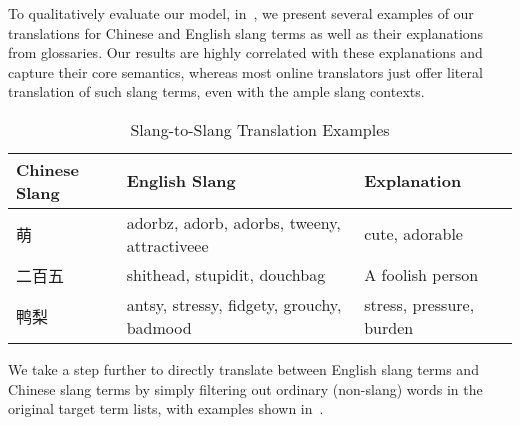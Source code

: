 To qualitatively evaluate our model, in~, 
we present several examples of our translations for Chinese and English slang 
terms as well as their explanations from glossaries.
Our results are highly correlated with these explanations and 
capture their core semantics, whereas most online translators just offer 
literal translation of such slang terms, even with the ample
slang contexts.
\begin{wraptable}{R}{0.5\textwidth} 
	\scriptsize
	\centering
	\caption{{Slang-to-Slang Translation Examples}\vspace{-5pt}}
	\begin{tabular}{C{1.92cm} C{2.5cm} C{2.0cm}}
		\textbf{Chinese Slang} & \textbf{English Slang} & \textbf{Explanation} \\ \hline
		萌 & adorbz, adorb, adorbs, tweeny, attractiveee & cute, adorable \\ \hline
		二百五 & shithead, stupidit, douchbag & A foolish person\\ \hline
		鸭梨 & antsy, stressy, fidgety, grouchy, badmood & stress, pressure, burden \\ \hline
	\end{tabular}
	\label{tab:bleis_4} 
\end{wraptable}

We take a step further to directly translate between 
English slang terms and Chinese slang terms by simply filtering out 
ordinary (non-slang) words in the original target term lists, with
examples shown in~. 




